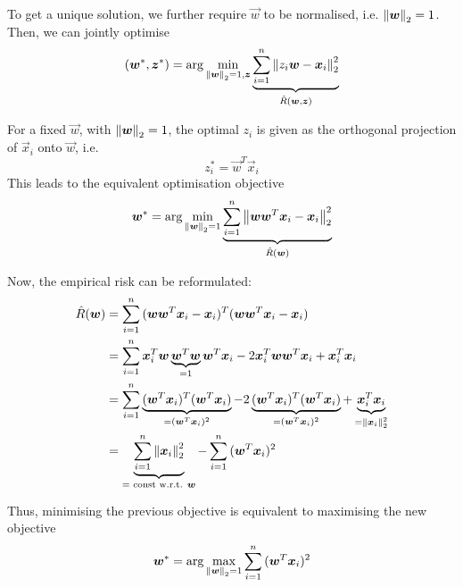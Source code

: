 To get a unique solution, we further require $\vec{w}$
to be normalised, i.e. $\left\lVert\boldsymbol{w}\right\rVert_2 = 1$.
Then, we can jointly optimise
\begin{equation*}
    (\boldsymbol{w}^*, \boldsymbol{z}^*) = \arg\min_{\left\lVert\boldsymbol{w}\right\rVert_2 = 1, \boldsymbol{z}}{
        \underbrace{
            \sum_{i=1}^n{\left\lVert z_i \boldsymbol{w} - \boldsymbol{x}_i\right\rVert_2^2}
        }_{\hat{R}(\boldsymbol{w}, \boldsymbol{z})}
    }
\end{equation*}

For a fixed $\vec{w}$, with $\left\lVert\boldsymbol{w}\right\rVert_2 = 1$,
the optimal $z_i$ is given as the
orthogonal projection of $\vec{x}_i$ onto $\vec{w}$, i.e.
\begin{equation*}
    z_i^* = \vec{w}^T \vec{x}_i
\end{equation*}
This leads to the equivalent optimisation objective
\begin{equation*}
    \boldsymbol{w}^* = \arg\min_{\left\lVert\boldsymbol{w}\right\rVert_2 = 1}{
        \underbrace{
            \sum_{i=1}^n{\left\lVert\boldsymbol{w} \boldsymbol{w}^T \boldsymbol{x}_i - \boldsymbol{x}_i\right\rVert_2^2}
        }_{\hat{R}(\boldsymbol{w})}
    }
\end{equation*}

Now, the empirical risk can be reformulated:
\begin{align*}
    \hat{R}(\boldsymbol{w}) &= \sum_{i=1}^n{
        (\boldsymbol{w} \boldsymbol{w}^T \boldsymbol{x}_i - \boldsymbol{x}_i)^T
        (\boldsymbol{w} \boldsymbol{w}^T \boldsymbol{x}_i - \boldsymbol{x}_i)
    } \\
    &= \sum_{i=1}^n{
        \boldsymbol{x}_i^T \boldsymbol{w} \underbrace{\boldsymbol{w}^T \boldsymbol{w}}_{=1} \boldsymbol{w}^T \boldsymbol{x}_i
        - 2 \boldsymbol{x}_i^T \boldsymbol{w} \boldsymbol{w}^T \boldsymbol{x}_i
        + \boldsymbol{x}_i^T \boldsymbol{x}_i
    } \\
    &= \sum_{i=1}^n{
        \underbrace{(\boldsymbol{w}^T \boldsymbol{x}_i)^T (\boldsymbol{w}^T \boldsymbol{x}_i)}_{= (\boldsymbol{w}^T \boldsymbol{x}_i)^2}
        - 2 \underbrace{(\boldsymbol{w}^T \boldsymbol{x}_i)^T (\boldsymbol{w}^T \boldsymbol{x}_i)}_{= (\boldsymbol{w}^T \boldsymbol{x}_i)^2}
        + \underbrace{\boldsymbol{x}_i^T \boldsymbol{x}_i}_{= \left\lVert\boldsymbol{x}_i\right\rVert_2^2}
    } \\
    &= \underbrace{\sum_{i=1}^n{\left\lVert\boldsymbol{x}_i\right\rVert_2^2}}_{
        = \text{ const w.r.t. $\boldsymbol{w}$}
    }
    - \sum_{i=1}^n{(\boldsymbol{w}^T \boldsymbol{x}_i)^2}
\end{align*}

Thus, minimising the previous objective is equivalent to
maximising the new objective
\begin{equation*}
    \boldsymbol{w}^* = \arg\max_{\left\lVert\boldsymbol{w}\right\rVert_2 = 1}{
        \sum_{i=1}^n{(\boldsymbol{w}^T \boldsymbol{x}_i)^2}
    }
\end{equation*}

